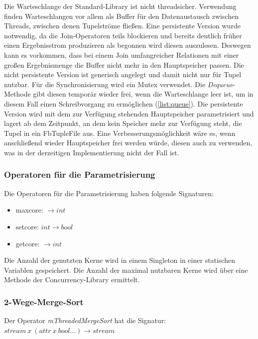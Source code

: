 \documentclass[a4paper,12pt,twoside]{article}
\newcommand{\Fb}[1]{\textit{#1}} %
\begin{document}
Die Warteschlange der Standard-Library ist nicht threadsicher. Verwendung finden Warteschlangen vor allem als Buffer für den Datenaustausch zwischen Threads, zwischen denen Tupelströme fließen. Eine persistente Version wurde notwendig, da die Join-Operatoren teils blockieren und bereits deutlich früher einen Ergebnisstrom produzieren als begonnen wird diesen auszulesen. Deswegen kann es vorkommen, dass bei einem Join umfangreicher Relationen mit einer großen Ergebnismenge die Buffer nicht mehr in den Hauptspeicher passen. Die nicht persistente Version ist generisch angelegt und damit nicht nur für Tupel nutzbar. Für die Synchronisierung wird ein Mutex verwendet. Die \Fb{Dequeue}-Methode gibt diesen temporär wieder frei, wenn die Warteschlange leer ist, um in diesem Fall einen Schreibvorgang zu ermöglichen (\autoref{list:queue}). Die persistente Version wird mit dem zur Verfügung stehenden Hauptspeicher parametrisiert und lagert ab dem Zeitpunkt, an dem kein Speicher mehr zur Verfügung steht, die Tupel in ein Fb{TupleFile} aus. Eine Verbesserungsmöglichkeit wäre es, wenn anschließend wieder Hauptspeicher frei werden würde, diesen auch zu verwenden, was in der derzeitigen Implementierung nicht der Fall ist.

\subsubsection{Operatoren für die Parametrisierung}

Die Operatoren für die Parametrisierung haben folgende Signaturen:

\begin{itemize}
	\item maxcore: $\longrightarrow int$
	\item setcore: $int \longrightarrow bool$
	\item getcore: $\longrightarrow int$
\end{itemize}

Die Anzahl der genutzten Kerne wird in einem Singleton in einer statischen Variablen gespeichert. Die Anzahl der maximal nutzbaren Kerne wird über eine Methode der Concurrency-Library ermittelt.

\subsubsection{2-Wege-Merge-Sort}

Der Operator \Fb{mThreadedMergeSort} hat die Signatur: \newline
$stream~x~(attr~x~bool \ldots) \longrightarrow stream$
 
\end{document}
